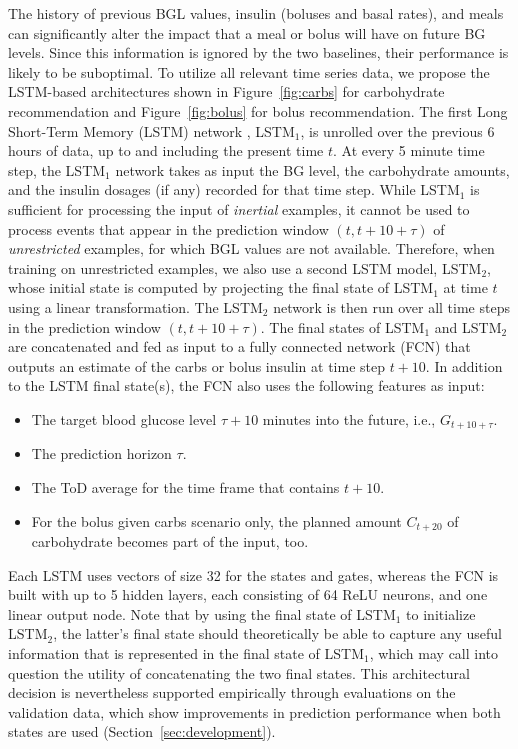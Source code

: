 \documentclass[journal,article,submit,moreauthors,pdftex]{Definitions/mdpi}
\begin{document}
The history of previous BGL values, insulin (boluses and basal rates), and meals can significantly alter the impact that a meal or bolus will have on future BG levels. Since this information is ignored by the two baselines, their performance is likely to be suboptimal. To utilize all relevant time series data, we propose the LSTM-based architectures shown in Figure~\ref{fig:carbs} for carbohydrate recommendation and Figure~\ref{fig:bolus} for bolus recommendation. The first Long Short-Term Memory (LSTM) network \cite{hochreiter:nc97}, LSTM$_1$, is unrolled over the previous 6 hours of data, up to and including the present time $t$. At every 5 minute time step, the LSTM$_1$ network takes as input the BG level, the carbohydrate amounts, and the insulin dosages (if any) recorded for that time step. While LSTM$_1$ is sufficient for processing the input of {\it inertial} examples, it cannot be used to process events that appear in the prediction window $(t, t+10+\tau)$ of {\it unrestricted} examples, for which BGL values are not available. Therefore, when training on unrestricted examples, we also use a second LSTM model, LSTM$_2$, whose initial state is computed by projecting the final state of LSTM$_1$ at time $t$ using a linear transformation. The LSTM$_2$ network is then run over all time steps in the prediction window $(t, t+10+\tau)$. The final states of LSTM$_1$ and LSTM$_2$ are concatenated and fed as input to a fully connected network (FCN) that outputs an estimate of the carbs or bolus insulin at time step $t+10$. In addition to the LSTM final state(s), the FCN also uses the following features as input:
\begin{itemize}
    \item The target blood glucose level $\tau+10$ minutes into the future, i.e., $G_{t + 10 + \tau}$.
    \item The prediction horizon $\tau$.
    \item The ToD average for the time frame that contains $t+10$.
    \item For the bolus given carbs scenario only, the planned amount $C_{t + 20}$ of carbohydrate becomes part of the input, too.
\end{itemize}
Each LSTM uses vectors of size 32 for the states and gates, whereas the FCN is built with up to 5 hidden layers, each consisting of 64 ReLU neurons, and one linear output node. Note that by using the final state of LSTM$_1$  to initialize LSTM$_2$, the latter's final state should theoretically be able to capture any useful information that is represented in the final state of LSTM$_1$, which may call into question the utility of concatenating the two final states. This architectural decision is nevertheless supported empirically through evaluations on the validation data, which show improvements in prediction performance when both states are used (Section~\ref{sec:development}).
\end{document}
